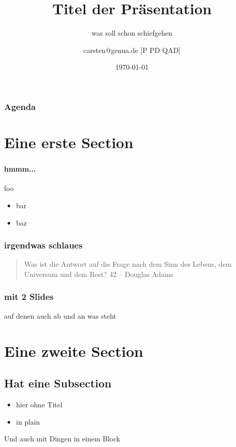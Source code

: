 \documentclass[aspectratio=169]{beamer}
\title{Titel der Präsentation}
\subtitle{was soll schon schiefgehen}
\date{\today}
\author{carsten@genua.de [P PD QAD]}
\begin{document}
\begin{frame}
	\titlepage
\end{frame}

\begin{frame}[tocframe]
  \frametitle{Agenda}
  \tableofcontents
\end{frame}

\section[Eine erste Section]{Eine erste Section}
\begin{frame}
  \frametitle{\insertsection}
  \framesubtitle{hmmm...}
  foo
  \begin{itemize}
  \item bar
  \item baz
  \end{itemize}
\end{frame}

\begin{frame}[quoteframe]
  \frametitle{irgendwas schlaues}
  \begin{quote}
    Was ist die Antwort auf die Frage nach dem Sinn des Lebens, dem Universum und dem Rest? 42
    -- Douglas Adams
  \end{quote}
\end{frame}

\begin{frame}
  \frametitle{mit 2 Slides}
  auf denen auch ab und an was steht
\end{frame}

\section{Eine zweite Section}

\begin{frame}[tocframe]
  \frametitle{\insertsection}
  \tableofcontents[currentsection]
\end{frame}

\subsection{Hat eine Subsection}
\begin{frame}[plain]
	\begin{itemize}
		\item hier ohne Titel
		\item in \lbrack plain\rbrack
	\end{itemize}

  \begin{important}
    Und auch mit Dingen in einem Block
  \end{important}
\end{frame}
\end{document}
